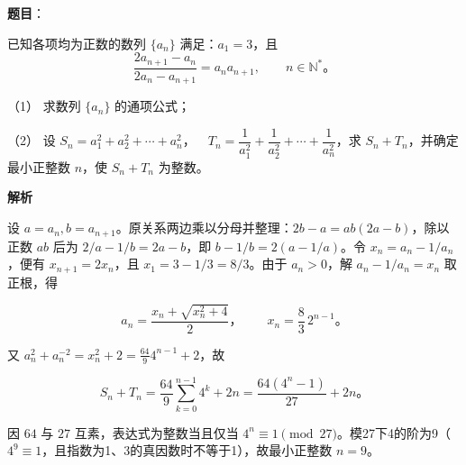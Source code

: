 \begin{answer}

\textbf{题目}：

已知各项均为正数的数列 $\{a_n\}$ 满足：$a_1=3$，且
\nopagebreak[4]
\[
\frac{2a_{n+1}-a_n}{2a_n-a_{n+1}}=a_na_{n+1},\qquad n\in\mathbb N^*。
\]

（1） 求数列 $\{a_n\}$ 的通项公式；

（2） 设 $S_n=a_1^2+a_2^2+\cdots+a_n^2\text{，}\quad T_n=\dfrac1{a_1^2}+\dfrac1{a_2^2}+\cdots+\dfrac1{a_n^2}$，求 $S_n+T_n$，并确定最小正整数 $n$，使 $S_n+T_n$ 为整数。

\textbf{解析}


设 $a=a_n,b=a_{n+1}$。原关系两边乘以分母并整理：$2b-a=ab(2a-b)$，除以正数 $ab$ 后为 $2/a-1/b=2a-b$，即 $b-1/b=2(a-1/a)$。令 $x_n=a_n-1/a_n$，便有 $x_{n+1}=2x_n$，且 $x_1=3-1/3=8/3$。由于 $a_n>0$，解 $a_n-1/a_n=x_n$ 取正根，得

\nopagebreak[4]
\[a_n=\frac{x_n+\sqrt{x_n^2+4}}2\text{，}\qquad x_n=\frac83\,2^{n-1}\text{。}\]


又 $a_n^2+a_n^{-2}=x_n^2+2=\frac{64}{9}4^{n-1}+2$，故

\nopagebreak[4]
\[S_n+T_n=\frac{64}{9}\sum_{k=0}^{n-1}4^k+2n=\frac{64(4^n-1)}{27}+2n\text{。}\]

因 $64$ 与 $27$ 互素，表达式为整数当且仅当 $4^n\equiv1\pmod{27}$。模27下4的阶为9（$4^9\equiv1$，且指数为1、3的真因数时不等于1），故最小正整数 $n=9$。



\end{answer}